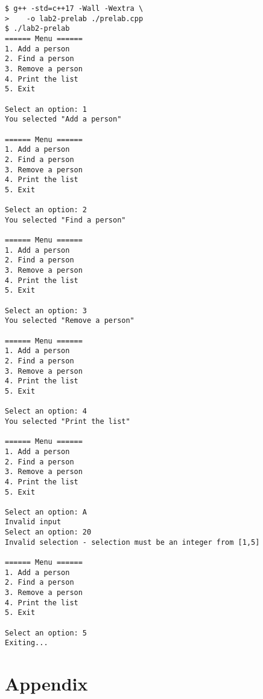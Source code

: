 \documentclass[11pt, letterpaper]{article} %
\begin{document}
\begin{lstlisting}[style=labreportstyle-sh]
$ g++ -std=c++17 -Wall -Wextra \
>    -o lab2-prelab ./prelab.cpp
$ ./lab2-prelab
====== Menu ======
1. Add a person
2. Find a person
3. Remove a person
4. Print the list
5. Exit

Select an option: 1
You selected "Add a person"

====== Menu ======
1. Add a person
2. Find a person
3. Remove a person
4. Print the list
5. Exit

Select an option: 2
You selected "Find a person"

====== Menu ======
1. Add a person
2. Find a person
3. Remove a person
4. Print the list
5. Exit

Select an option: 3
You selected "Remove a person"

====== Menu ======
1. Add a person
2. Find a person
3. Remove a person
4. Print the list
5. Exit

Select an option: 4
You selected "Print the list"

====== Menu ======
1. Add a person
2. Find a person
3. Remove a person
4. Print the list
5. Exit

Select an option: A
Invalid input
Select an option: 20
Invalid selection - selection must be an integer from [1,5]

====== Menu ======
1. Add a person
2. Find a person
3. Remove a person
4. Print the list
5. Exit

Select an option: 5
Exiting...
\end{lstlisting}


\clearpage
\section*{Appendix}
\renewcommand{\thelstlisting}{A.\arabic{lstlisting}}


\end{document}
